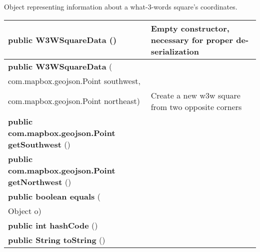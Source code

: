  { Object representing information about a what{-}3{-}words square's coordinates.
 
\begin{tabular}{ p{3in}|m{3.4in}}
\textbf{public W3WSquareData} () & Empty constructor, necessary for proper de{-}serialization\\ \hline 
\textbf{public W3WSquareData } (\\ \hspace*{ 5pt} com.mapbox.geojson.Point southwest,\\\hspace*{ 5pt} com.mapbox.geojson.Point northeast) & Create a new w3w square from two opposite corners\\ \hline 
\textbf{public com.mapbox.geojson.Point getSouthwest} () & \\ \hline 
\textbf{public com.mapbox.geojson.Point getNorthwest} () & \\ \hline 
\textbf{public boolean equals } (\\ \hspace*{ 5pt} Object o) & \\ \hline 
\textbf{public int hashCode} () & \\ \hline 
\textbf{public String toString} () & \\ \hline 
\end{tabular}
}
